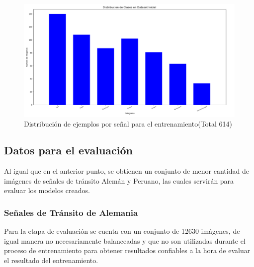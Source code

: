 			\begin{figure}[H]
				\begin{center}
				\includegraphics[width=1\textwidth]{images/desarrollo/histograms/inicioTrain614}
				\end{center}
				\begin{center}
				\caption{\small{Distribución de ejemplos por señal para el entrenamiento(Total 614)}}
				{\small{\fontsize{10}{16.8}\selectfont {Fuente: Elaboración propia}}}
				\end{center}
				\vspace{-1.5em}
			\end{figure}

			

	\subsection{Datos para el evaluación}
		Al igual que en el anterior punto, se obtienen un conjunto de menor cantidad de imágenes de señales de tránsito Alemán y Peruano, las cuales servirán para evaluar los modelos creados.

		\subsubsection{Señales de Tránsito de Alemania}
		Para la etapa de evaluación se cuenta con un conjunto de 12630 imágenes, de igual manera no necesariamente balanceadas y que no son utilizadas durante el proceso de entrenamiento para obtener resultados confiables a la hora de evaluar el resultado del entrenamiento. 

